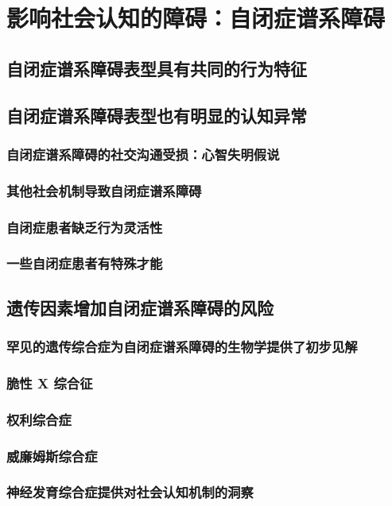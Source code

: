 \chapter{影响社会认知的障碍：自闭症谱系障碍}

\section{自闭症谱系障碍表型具有共同的行为特征}

\section{自闭症谱系障碍表型也有明显的认知异常}
\subsection{自闭症谱系障碍的社交沟通受损：心智失明假说}
\subsection{其他社会机制导致自闭症谱系障碍}
\subsection{自闭症患者缺乏行为灵活性}
\subsection{一些自闭症患者有特殊才能}

\section{遗传因素增加自闭症谱系障碍的风险}
\subsection{罕见的遗传综合症为自闭症谱系障碍的生物学提供了初步见解}
\subsection{脆性 X 综合征}
\subsection{权利综合症}
\subsection{威廉姆斯综合症}
\subsection{神经发育综合症提供对社会认知机制的洞察}

